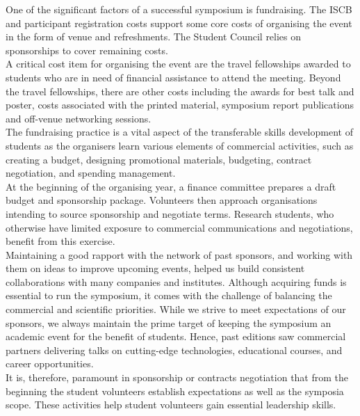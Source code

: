 \documentclass[]{article}%
\begin{document}
	One of the significant factors of a successful symposium is fundraising. The ISCB and participant registration costs support some core costs of organising the event in the form of venue and refreshments. The Student Council relies on sponsorships to cover remaining costs.\\
	
	A critical cost item for organising the event are the travel fellowships awarded to students who are in need of financial assistance to attend the meeting. Beyond the travel fellowships, there are other costs including the awards for best talk and poster, costs associated with the printed material, symposium report publications and off-venue networking sessions. \\
	
	The fundraising practice is a vital aspect of the transferable skills development of students as the organisers learn various elements of commercial activities, such as creating a budget, designing promotional materials, budgeting, contract negotiation, and spending management. \\
	
	At the beginning of the organising year, a finance committee prepares a draft budget and sponsorship package. Volunteers then approach organisations intending to source sponsorship and negotiate terms. Research students, who otherwise have limited exposure to commercial communications and negotiations, benefit from this exercise. \\
	
	Maintaining a good rapport with the network of past sponsors, and working with them on ideas to improve upcoming events, helped us build consistent collaborations with many companies and institutes. Although acquiring funds is essential to run the symposium, it comes with the challenge of balancing the commercial and scientific priorities. While we strive to meet expectations of our sponsors, we always maintain the prime target of keeping the symposium an academic event for the benefit of students. Hence, past editions saw commercial partners delivering talks on cutting-edge technologies, educational courses, and career opportunities. \\
	
	It is, therefore, paramount in sponsorship or contracts negotiation that from the beginning the student volunteers establish expectations as well as the symposia scope. These activities help student volunteers gain essential leadership skills.\\
	
\end{document}
